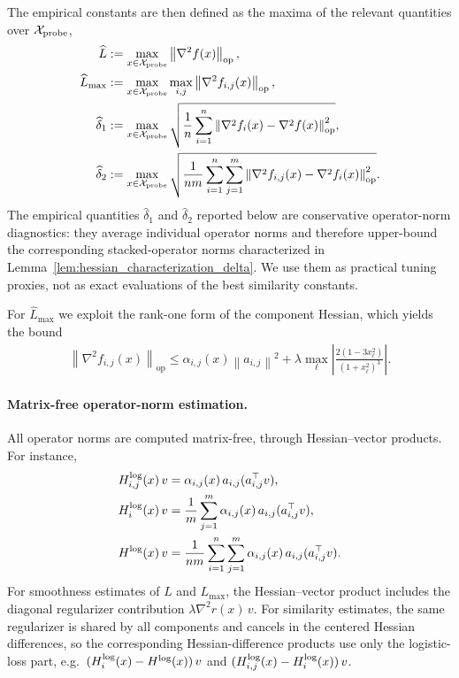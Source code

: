 \documentclass{article}
\newcommand{\op}{\operatorname{op}}
\newcommand{\sqn}[1]{\left\| #1 \right\|^2}
\newcommand{\opnorm}[1]{\left\| #1 \right\|_{\op}}      %
\newcommand{\eqdef}{:=}
\theoremstyle{plain}
\begin{document}
The empirical constants are then defined as the maxima of the relevant quantities over $\mathcal{X}_{\rm probe}$,
\begin{align}
    \widehat L
    &\eqdef
    \max_{x\in\mathcal{X}_{\rm probe}}
    \opnorm{\nabla^2 f(x)}, \\
    \widehat L_{\max}
    &\eqdef
    \max_{x\in\mathcal{X}_{\rm probe}}
    \max_{i,j}
    \opnorm{\nabla^2 f_{i,j}(x)}, \\
    \widehat\delta_1
    &\eqdef
    \max_{x\in\mathcal{X}_{\rm probe}}
    \sqrt{
    \frac{1}{n}\sum_{i=1}^n
    \opnorm{\nabla^2 f_i(x)-\nabla^2 f(x)}^2
    }, \\
    \widehat\delta_2
    &\eqdef
    \max_{x\in\mathcal{X}_{\rm probe}}
    \sqrt{
    \frac{1}{nm}\sum_{i=1}^n\sum_{j=1}^m
    \opnorm{\nabla^2 f_{i,j}(x)-\nabla^2 f_i(x)}^2
    } .
\end{align}
The empirical quantities $\widehat{\delta}_1$ and $\widehat{\delta}_2$ reported below are conservative operator-norm diagnostics: they average individual operator norms and therefore upper-bound the corresponding stacked-operator norms characterized in Lemma~\ref{lem:hessian_characterization_delta}. We use them as practical tuning proxies, not as exact evaluations of the best similarity constants.

For $\widehat L_{\max}$ we exploit the rank-one form of the component Hessian, which yields the bound
\begin{align}
    \opnorm{\nabla^2 f_{i,j}(x)}
    \leq
    \alpha_{i,j}(x)\sqn{a_{i,j}}
    +
    \lambda\max_{\ell}
    \left|
        \frac{2(1-3x_\ell^2)}{(1+x_\ell^2)^3}
    \right| .
\end{align}

\paragraph{Matrix-free operator-norm estimation.}
All operator norms are computed matrix-free, through Hessian--vector products. For instance,
\begin{align}
    H^{\rm log}_{i,j}(x)\,v
    &=
    \alpha_{i,j}(x)\,a_{i,j}(a_{i,j}^{\top}v), \\
    H^{\rm log}_{i}(x)\,v
    &=
    \frac{1}{m}\sum_{j=1}^m
    \alpha_{i,j}(x)\,a_{i,j}(a_{i,j}^{\top}v), \\
    H^{\rm log}(x)\,v
    &=
    \frac{1}{nm}\sum_{i=1}^n\sum_{j=1}^m
    \alpha_{i,j}(x)\,a_{i,j}(a_{i,j}^{\top}v).
\end{align}
For smoothness estimates of $L$ and $L_{\max}$, the Hessian--vector product includes the diagonal regularizer contribution $\lambda\nabla^2 r(x)\,v$. For similarity estimates, the same regularizer is shared by all components and cancels in the centered Hessian differences, so the corresponding Hessian-difference products use only the logistic-loss part, e.g.\ $(H_i^{\rm log}(x)-H^{\rm log}(x))\,v$ and $(H_{i,j}^{\rm log}(x)-H_i^{\rm log}(x))\,v$.
\end{document}
